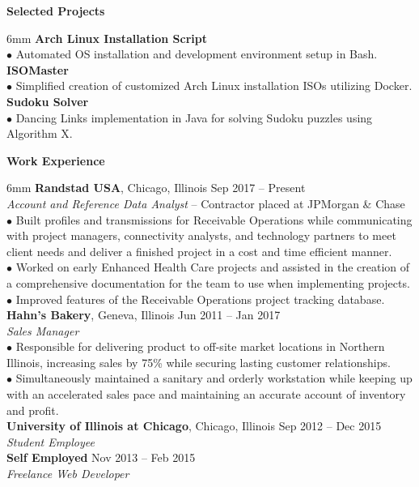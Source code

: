 \documentclass[11pt]{article}
\newcommand{\sectionheader}[1]{\noindent \textbf{\large #1}}
\newenvironment{sectionbody}{\begin{adjustwidth}{6mm}{}}{\end{adjustwidth}}
\begin{document}
\sectionheader{Selected Projects}
\begin{sectionbody}
{\bf Arch Linux Installation Script} \\
$\bullet$ Automated OS installation and development environment setup in Bash. \\
{\bf ISOMaster} \\
$\bullet$ Simplified creation of customized Arch Linux installation ISOs utilizing Docker. \\
{\bf Sudoku Solver} \\
$\bullet$ Dancing Links implementation in Java for solving Sudoku puzzles using Algorithm X.
\end{sectionbody}

\vspace{2mm}

\sectionheader{Work Experience}
\begin{sectionbody}
{\bf Randstad USA}, Chicago, Illinois \hfill Sep 2017 -- Present \\
\textit{Account and Reference Data Analyst} -- Contractor placed at JPMorgan \& Chase \\
$\bullet$ Built profiles and transmissions for Receivable Operations while communicating with project managers, connectivity analysts, and technology partners to meet client needs and deliver a finished project in a cost and time efficient manner. \\
$\bullet$ Worked on early Enhanced Health Care projects and assisted in the creation of a comprehensive documentation for the team to use when implementing projects. \\
$\bullet$ Improved features of the Receivable Operations project tracking database. \\
{\bf Hahn's Bakery}, Geneva, Illinois \hfill Jun 2011 -- Jan 2017 \\
\textit{Sales Manager} \\
$\bullet$ Responsible for delivering product to off-site market locations in Northern Illinois, increasing sales by 75\% while securing lasting customer relationships. \\
$\bullet$ Simultaneously maintained a sanitary and orderly workstation while keeping up with an accelerated sales pace and maintaining an accurate account of inventory and profit. \\
{\bf University of Illinois at Chicago}, Chicago, Illinois \hfill Sep 2012 -- Dec 2015 \\
\textit{Student Employee} \\
{\bf Self Employed} \hfill Nov 2013 -- Feb 2015 \\
\textit{Freelance Web Developer}
\end{sectionbody}
\end{document}
